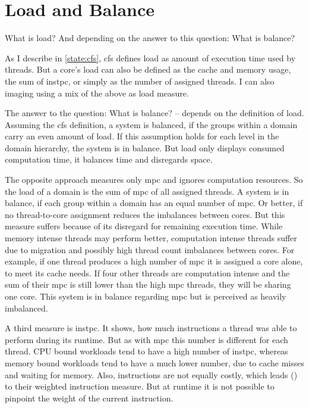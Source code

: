\section{Load and Balance}
\label{design:load}


What is load?
And depending on the answer to this question: What is balance?

As I describe in \ref{state:cfs}, \gls{cfs} defines load as amount of
execution time used by threads.
But a core's load can also be defined as
the cache and memory usage, the sum of \gls{instpc}, or simply as the number of
assigned threads.
I can also imaging using a mix of the above as load measure.

The answer to the question: What is balance? -- depends on the definition of
load.
Assuming the \gls{cfs} definition, a system is balanced, if the groups within a
domain carry an even amount of load.
If this assumption holds for each level in the domain hierarchy, the system is
in balance.
But load only displays consumed computation time, it balances time and
disregards space.

The opposite approach measures only \gls{mpc} and ignores computation
resources.
So the load of a domain is the sum of \gls{mpc} of all assigned threads.
A system is in balance, if each group within a domain has an equal number of
\gls{mpc}.
Or better, if no thread-to-core assignment reduces the imbalances between cores.
But this measure suffers because of its disregard for remaining execution time.
While memory intense threads may perform better, computation intense threads
suffer due to migration and possibly high thread count imbalances between
cores.
For example, if one thread produces a high number of \gls{mpc} it is assigned a
core alone, to meet its cache needs.
If four other threads are computation intense and the sum of their \gls{mpc} is
still lower than the high \gls{mpc} threads, they will be sharing one core.
This system is in balance regarding \gls{mpc} but is perceived as heavily
imbalanced.

A third measure is \gls{instpc}.
It shows, how much instructions a thread was able to perform during its
runtime.
But as with \gls{mpc} this number is different for each thread.
CPU bound workloads tend to have a high number of \gls{instpc},
whereas memory bound workloads tend to have a much lower number, due to cache
misses and waiting for memory.
Also, instructions are not equally costly, which leads
\citeauthor{snavely_symbiotic_2000} (\cite{snavely_symbiotic_2000}) to their
weighted instruction measure.
But at runtime it is not possible to pinpoint the weight of the current
instruction.


